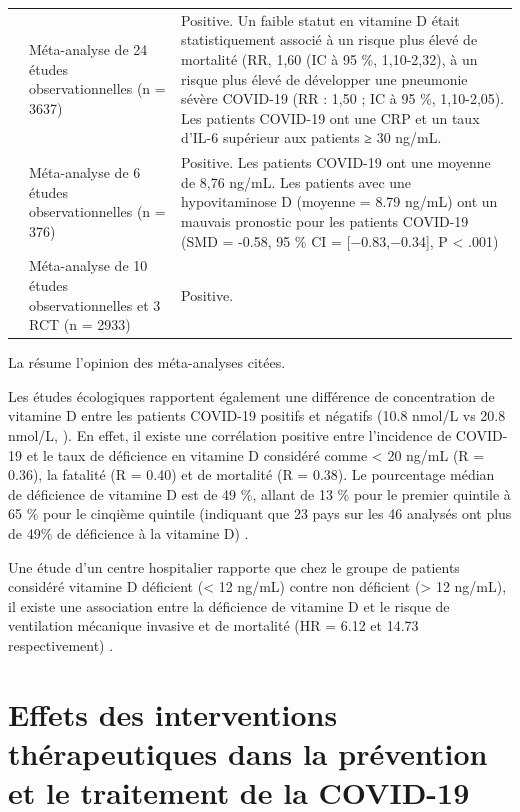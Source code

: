 \documentclass[
  a4paper,
  DIV=11,
  numbers=noendperiod,
  listof=totoc]{scrreprt}
\begin{document}
\begin{landscape}
\begin{center}
\begin{tabularx}{\linewidth}{@{}lp{6cm}Y@{}}
\textcite{Ben-Eltriki.2022} & Méta-analyse de 24 études observationnelles (n = 3637) & Positive. Un faible statut en vitamine D était statistiquement associé à un risque plus élevé de mortalité (RR, 1,60 (IC à 95 \%, 1,10-2,32), à un risque plus élevé de développer une pneumonie sévère COVID-19 (RR : 1,50 ; IC à 95 \%, 1,10-2,05). Les patients COVID-19 ont une CRP et un taux d'IL-6 supérieur aux patients ≥ 30 ng/mL.\\

\textcite{Munshi.2021} & Méta-analyse de 6 études observationnelles (n = 376) & Positive. Les patients COVID-19 ont une moyenne de 8,76 ng/mL. Les patients avec une hypovitaminose D (moyenne = 8.79 ng/mL) ont un mauvais pronostic pour les patients COVID-19 (SMD = -0.58, 95 \% CI = [−0.83,−0.34], P < .001)\\

\textcite{Pal.2022} & Méta-analyse de 10 études observationnelles et 3 \ac{RCT} (n = 2933) & Positive.\\

\end{tabularx}
\end{center}
\end{landscape}

La  résume l'opinion des méta-analyses citées.

Les études écologiques rapportent également une différence de
concentration de vitamine D entre les patients COVID-19 positifs et
négatifs (10.8 nmol/L vs 20.8 nmol/L, \textcite{Baktash.2021}). En
effet, il existe une corrélation positive entre l'incidence de COVID-19
et le taux de déficience en vitamine D considéré comme \textless{} 20
ng/mL (R = 0.36), la fatalité (R = 0.40) et de mortalité (R = 0.38). Le
pourcentage médian de déficience de vitamine D est de 49 \%, allant de
13 \% pour le premier quintile à 65 \% pour le cinqième quintile
(indiquant que 23 pays sur les 46 analysés ont plus de 49\% de
déficience à la vitamine D) \autocite{Mariani.2021}.

Une étude d'un centre hospitalier rapporte que chez le groupe de
patients considéré vitamine D déficient (\textless{} 12 ng/mL) contre
non déficient (\textgreater{} 12 ng/mL), il existe une association entre
la déficience de vitamine D et le risque de ventilation mécanique
invasive et de mortalité (HR = 6.12 et 14.73 respectivement)
\autocite{Radujkovic.2020}.

\section{Effets des interventions thérapeutiques dans la prévention et
le traitement de la
COVID-19}\label{effets-des-interventions-thuxe9rapeutiques-dans-la-pruxe9vention-et-le-traitement-de-la-covid-19}
\end{document}
